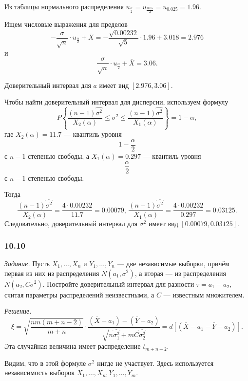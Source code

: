 Из таблицы нормального распределения
$u_{ \frac{ \alpha }{2}} =
  u_{ \frac{0.05}{2}} =
  u_{0.025} =
  1.96$.

Ищем числовые выражения для пределов
$$- \frac{ \sigma }{ \sqrt{n}} \cdot u_{ \frac{ \alpha }{2}} + \overline{X} =
  - \frac{ \sqrt{0.00232}}{ \sqrt{5}} \cdot 1.96 + 3.018 =
  2.976$$
и
$$ \frac{ \sigma }{ \sqrt{n}} \cdot u_{ \frac{ \alpha }{2}} + \overline{X} =
  3.06.$$

Доверительный интервал для $a$ имеет вид $ \left[ 2.976, 3.06 \right] $.

Чтобы найти доверительный интервал для дисперсии, используем формулу
$$P \left\{
    \frac{ \left( n - 1 \right) \hat{ \sigma^2}}{X_2 \left( \alpha \right) } \leq \sigma^2 \leq
    \frac{ \left( n - 1 \right) \hat{ \sigma^2}}{X_1 \left( \alpha \right) }
  \right\} =
  1 - \alpha,$$
где $X_2 \left( \alpha \right)  = 11.7$ --- квантиль уровня
$$1 - \frac{ \alpha }{2}$$
с $n - 1$ степенью свободы, а $X_1 \left( \alpha \right) = 0.297$ --- квантиль уровня
$$ \frac{ \alpha }{2}$$
с $n - 1$ степенью свободы.

Тогда
$$ \frac{ \left( n - 1 \right) \hat{ \sigma^2}}{X_2 \left( \alpha \right) } =
  \frac{4 \cdot 0.00232}{11.7} =
  0.00079, \,
  \frac{ \left( n - 1 \right) \hat{ \sigma^2}}{X_1 \left( \alpha \right) } =
  \frac{4 \cdot 0.00232}{0.297} =
  0.03125.$$
Следовательно, доверительный интервал для $ \sigma^2$ имеет вид $ \left[ 0.00079, 0.03125 \right] $.

\subsubsection*{10.10}

\textit{Задание.}
Пусть $X_1, \dotsc, X_n$ и $Y_1, \dotsc, Y_n$ --- две независимые выборки,
причём первая из них из распределения $N \left( a_1, \sigma^2 \right) $, а вторая ---
из распределения $N \left( a_2, C \sigma^2 \right) $.
Постройте доверительный интервал для разности $ \tau = a_1 - a_2$,
считая параметры распределений неизвестными, а $C$ --- известным множителем.

\textit{Решение.}
$$ \xi =
  \sqrt{ \frac{nm \left( m + n - 2 \right) }{m + n}} \cdot
  \frac{ \left( \overline{X} - a_1 \right) - \left( \overline{Y} - a_2 \right) }{ \sqrt{n \hat{ \sigma_1^2} + mC \hat{ \sigma_2^2}}} =
  d \left[ \left( \overline{X} - a_1 - \overline{Y} - a_2 \right) \right].$$
Эта случайная величина имеет распределение $t_{m + n - 2}$.

Видим, что в этой формуле $ \sigma^2$ нигде не участвует.
Здесь используется независимость выборок $X_1, \dotsc, X_n, Y_1, \dotsc, Y_m$.

